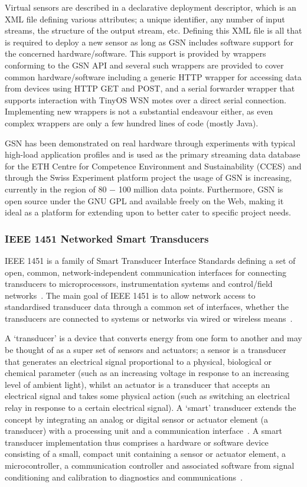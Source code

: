 Virtual sensors are described in a declarative deployment descriptor, which is an XML file defining various attributes; a unique identifier, any number of input streams, the structure of the output stream, etc. Defining this XML file is all that is required to deploy a new sensor as long as GSN includes software support for the concerned hardware/software. This support is provided by wrappers conforming to the GSN API and several such wrappers are provided to cover common hardware/software including a generic HTTP wrapper for accessing data from devices using HTTP GET and POST, and a serial forwarder wrapper that supports interaction with TinyOS WSN motes over a direct serial connection. Implementing new wrappers is not a substantial endeavour either, as even complex wrappers are only a few hundred lines of code (mostly Java).

GSN has been demonstrated on real hardware through experiments with typical high-load application profiles and is used as the primary streaming data database for the ETH Centre for Competence Environment and Sustainability (CCES) and through the Swiss Experiment platform project the usage of GSN is increasing, currently in the region of 80 $-$ 100 million data points. Furthermore, GSN is open source under the GNU GPL and available freely on the Web, making it ideal as a platform for extending upon to better cater to specific project needs.

\subsubsection{IEEE 1451 Networked Smart Transducers}
\label{subsec:ieee_1451_smart_transducers}
IEEE 1451 is a family of Smart Transducer Interface Standards defining a set of open, common, network-independent communication interfaces for connecting transducers to microprocessors, instrumentation systems and control/field networks~\cite{lee:standard}. The main goal of IEEE 1451 is to allow network access to standardised transducer data through a common set of interfaces, whether the transducers are connected to systems or networks via wired or wireless means~\cite{Song2008}.

A `transducer' is a device that converts energy from one form to another and may be thought of as a super set of sensors and actuators; a sensor is a transducer that generates an electrical signal proportional to a physical, biological or chemical parameter (such as an increasing voltage in response to an increasing level of ambient light), whilst an actuator is a transducer that accepts an electrical signal and takes some physical action (such as switching an electrical relay in response to a certain electrical signal). A `smart' transducer extends the concept by integrating an analog or digital sensor or actuator element (a transducer) with a processing unit and a communication interface~\cite{elmenreich:smarttransducer}. A smart transducer implementation thus comprises a hardware or software device consisting of a small, compact unit containing a sensor or actuator element, a microcontroller, a communication controller and associated software from signal conditioning and calibration to diagnostics and communications~\cite{OMG2007}.

